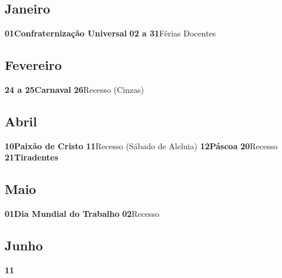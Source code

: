 \documentclass[thesis]{hmcposter}
\begin{document}
\begin{poster}
\newpage\subsection{Janeiro}\textbf{01}\quad \quad \quad \quad \textbf{Confraternização Universal} \newline\textbf{02 a 31}\quad \quad Férias Docentes \newline\subsection{Fevereiro}\textbf{24 a 25}\quad \quad \textbf{Carnaval} \newline\textbf{26}\quad \quad \quad \quad Recesso (Cinzas) \newline\subsection{Abril}\textbf{10}\quad \quad \quad \quad \textbf{Paixão de Cristo} \newline\textbf{11}\quad \quad \quad \quad Recesso (Sábado de Aleluia) \newline\textbf{12}\quad \quad \quad \quad \textbf{Páscoa} \newline\textbf{20}\quad \quad \quad \quad Recesso \newline\textbf{21}\quad \quad \quad \quad \textbf{Tiradentes} \newline\subsection{Maio}\textbf{01}\quad \quad \quad \quad \textbf{Dia Mundial do Trabalho} \newline\textbf{02}\quad \quad \quad \quad Recesso \newline\subsection{Junho}\textbf{11}\quad \quad \
\end{poster}
\end{document}
